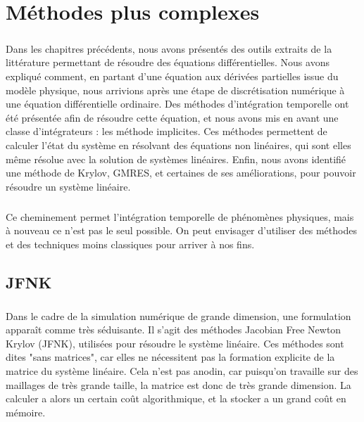 \chapter{Méthodes plus complexes}

\paragraph{}
Dans les chapitres précédents, nous avons présentés des outils extraits de la littérature permettant de résoudre des équations différentielles.
Nous avons expliqué comment, en partant d'une équation aux dérivées partielles issue du modèle physique, nous arrivions après une étape de discrétisation numérique à une équation différentielle ordinaire.
Des méthodes d'intégration temporelle ont été présentée afin de résoudre cette équation, et nous avons mis en avant une classe d'intégrateurs : les méthode implicites.
Ces méthodes permettent de calculer l'état du système en résolvant des équations non linéaires, qui sont elles même résolue avec la solution de systèmes linéaires.
Enfin, nous avons identifié une méthode de Krylov, GMRES, et certaines de ses améliorations, pour pouvoir résoudre un système linéaire.

\paragraph{}
Ce cheminement permet l'intégration temporelle de phénomènes physiques, mais à nouveau ce n'est pas le seul possible.
On peut envisager d'utiliser des méthodes et des techniques moins classiques pour arriver à nos fins.


\section{JFNK}

  \paragraph{}
  Dans le cadre de la simulation numérique de grande dimension, une formulation apparaît comme très séduisante.
  Il s'agit des méthodes Jacobian Free Newton Krylov (JFNK), utilisées pour résoudre le système linéaire.
  Ces méthodes sont dites "sans matrices", car elles ne nécessitent pas la formation explicite de la matrice du système linéaire.
  Cela n'est pas anodin, car puisqu'on travaille sur des maillages de très grande taille, la matrice est donc de très grande dimension.
  La calculer a alors un certain coût algorithmique, et la stocker a un grand coût en mémoire.
